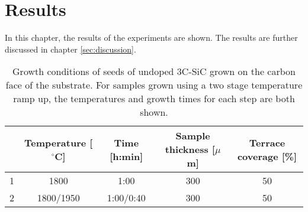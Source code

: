 

	
	

	
	

\chapter{Results}
In this chapter, the results of the experiments are shown. The results are further discussed in chapter \ref{sec:discussion}. 

\begin{table}[h]
\caption{Growth conditions of seeds of undoped 3C-SiC grown on the carbon face of the substrate. For samples grown using a two stage temperature ramp up, the temperatures and growth times for each step are both shown.}
\label{tab:seeds}
\begin{center}
\begin{tabular}{l c c c c}
  \hline                       
  \hline       
  \vspace{1mm}
   & \small{Temperature [$^\circ$C]} & \small{Time [h:min]} & \small{Sample thickness [$\mu$m]} & \small{Terrace coverage [\%]}\\
    \hline
  1 & 1800 & 1:00 & 300 & 50\\
  2 & 1800/1950 & 1:00/0:40 & 300 & 50\\
  \hline  
\end{tabular}
\end{center}
\end{table}

